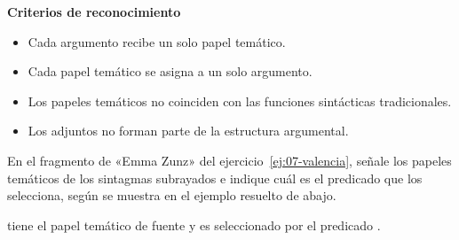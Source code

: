 \begin{destacado}
\textbf{Criterios de reconocimiento}
\begin{itemize}
  \item Cada argumento recibe un solo papel temático.
  \item Cada papel temático se asigna a un solo argumento.
  \item Los papeles temáticos no coinciden con las funciones sintácticas
        tradicionales.
  \item Los adjuntos no forman parte de la estructura argumental.
\end{itemize}
\end{destacado}

\begin{ejercicio}\label{ej:07-papeles}
En el fragmento de «Emma Zunz» del ejercicio~\ref{ej:07-valencia}, señale los
papeles temáticos de los sintagmas subrayados e indique cuál es el predicado que
los selecciona, según se muestra en el ejemplo resuelto de abajo.


\begin{resuelto}
 tiene el papel temático de
fuente y es seleccionado por el predicado .
\end{resuelto}
\end{ejercicio}

